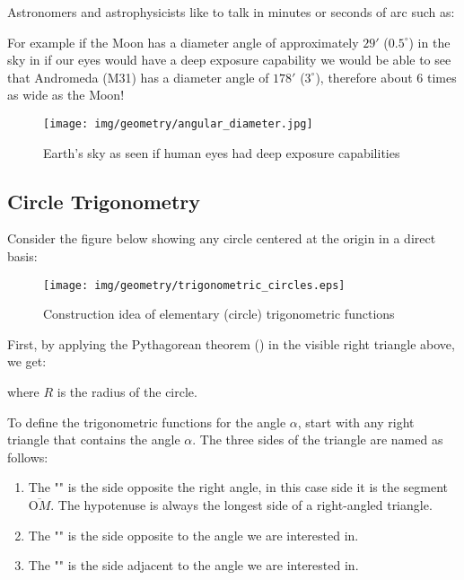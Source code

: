 	Astronomers and astrophysicists like to talk in minutes or seconds of arc such as:
	
	For example if the Moon has a diameter angle of approximately $29'$ ($0.5^\circ$) in the sky in if our eyes would have a deep exposure capability we would be able to see that Andromeda (M31) has a diameter angle of $178'$ ($3^\circ$), therefore about $6$ times as wide as the Moon!
	\begin{figure}[H]
		\centering
		\texttt{[image: img/geometry/angular\_diameter.jpg]}
		\caption[]{Earth's sky as seen if human eyes had deep exposure capabilities}
	\end{figure}

	\pagebreak
	\subsection{Circle Trigonometry}

	Consider the figure below showing any circle centered at the origin in a direct basis:	
	
	\begin{figure}[H]
		\centering
		\texttt{[image: img/geometry/trigonometric\_circles.eps]}
		\caption{Construction idea of elementary (circle) trigonometric functions}
	\end{figure}

	First, by applying the Pythagorean theorem () in the visible right triangle above, we get:
	
where $R$ is the radius of the circle.

	To define the trigonometric functions for the angle $\alpha$, start with any right triangle that contains the angle $\alpha$. The three sides of the triangle are named as follows:
	\begin{enumerate}
		\item The "" is the side opposite the right angle, in this case side it is the segment $\overline{\text{O}M}$. The hypotenuse is always the longest side of a right-angled triangle.
		
		\item The "" is the side opposite to the angle we are interested in.
		
		\item The "" is the side adjacent to the angle we are interested in.
	\end{enumerate}

